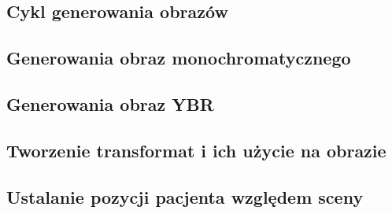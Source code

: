 

\subsection{Cykl generowania obrazów}


\subsection{Generowania obraz monochromatycznego}


\subsection{Generowania obraz YBR}


\subsection{Tworzenie transformat i ich użycie na obrazie}


\subsection{Ustalanie pozycji pacjenta względem sceny}
